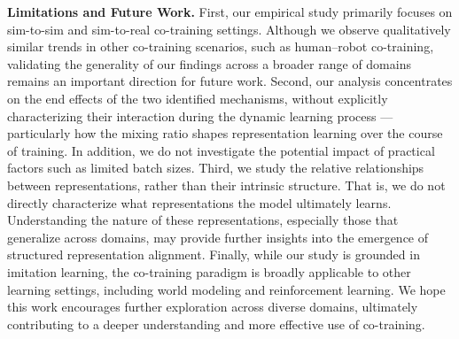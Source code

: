 \textbf{Limitations and Future Work.}
First, our empirical study primarily focuses on sim-to-sim and sim-to-real co-training settings. Although we observe qualitatively similar trends in other co-training scenarios, such as human–robot co-training, validating the generality of our findings across a broader range of domains remains an important direction for future work.
Second, our analysis concentrates on the end effects of the two identified mechanisms, without explicitly characterizing their interaction during the dynamic learning process — particularly how the mixing ratio shapes representation learning over the course of training. In addition, we do not investigate the potential impact of practical factors such as limited batch sizes.
Third, we study the relative relationships between representations, rather than their intrinsic structure. That is, we do not directly characterize what representations the model ultimately learns. Understanding the nature of these representations, especially those that generalize across domains, may provide further insights into the emergence of structured representation alignment.
Finally, while our study is grounded in imitation learning, the co-training paradigm is broadly applicable to other learning settings, including world modeling and reinforcement learning. We hope this work encourages further exploration across diverse domains, ultimately contributing to a deeper understanding and more effective use of co-training.

